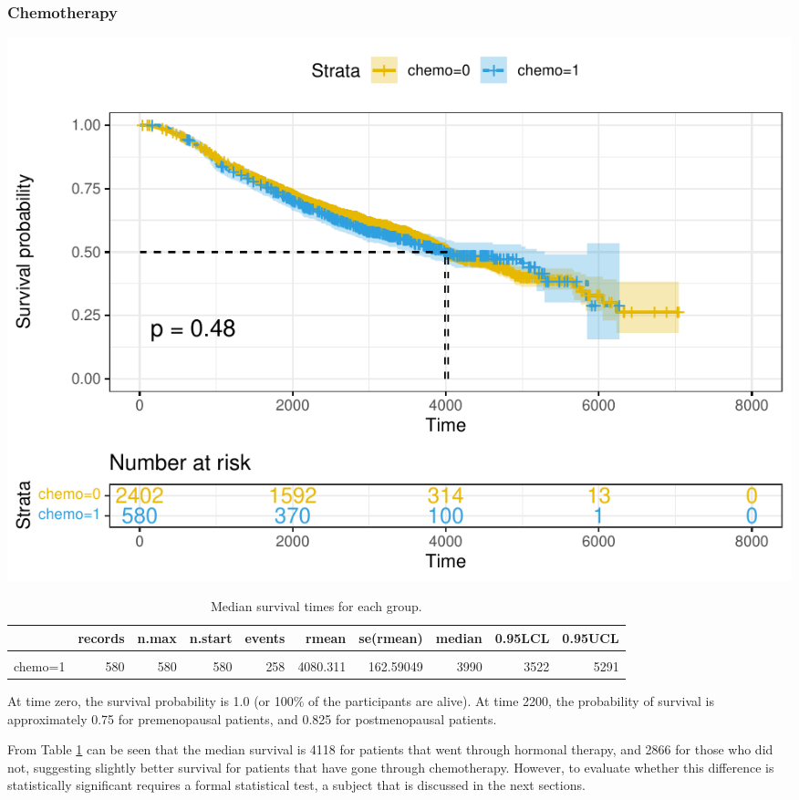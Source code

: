 \documentclass[
]{article}
\begin{document}
\subsubsection{Chemotherapy}

\begin{center}\includegraphics[width=0.85\linewidth,]{project_files/figure-latex/unnamed-chunk-9-1} \end{center}

\begin{table}[!h]

\caption{\label{tab:median-chemo}Median survival times for each group.}
\centering
\fontsize{8}{10}\selectfont
\begin{tabular}[t]{l|r|r|r|r|r|r|r|r|r}
\hline
  & records & n.max & n.start & events & rmean & se(rmean) & median & 0.95LCL & 0.95UCL\\
\hline
\cellcolor{gray!6}{chemo=0} & \cellcolor{gray!6}{2402} & \cellcolor{gray!6}{2402} & \cellcolor{gray!6}{2402} & \cellcolor{gray!6}{1014} & \cellcolor{gray!6}{4103.663} & \cellcolor{gray!6}{80.06765} & \cellcolor{gray!6}{4033} & \cellcolor{gray!6}{3885} & \cellcolor{gray!6}{4239}\\
\hline
chemo=1 & 580 & 580 & 580 & 258 & 4080.311 & 162.59049 & 3990 & 3522 & 5291\\
\hline
\end{tabular}
\end{table}

At time zero, the survival probability is 1.0 (or 100\% of the
participants are alive). At time 2200, the probability of survival is
approximately 0.75 for premenopausal patients, and 0.825 for
postmenopausal patients.

From Table \ref{tab:median-chemo} can be seen that the median survival is 4118 for patients that went through hormonal therapy, and 2866 for those who did not, suggesting slightly better survival for patients that have gone through chemotherapy. However, to evaluate whether this difference is statistically significant requires a formal statistical test, a subject that is discussed in the next sections.
\end{document}
